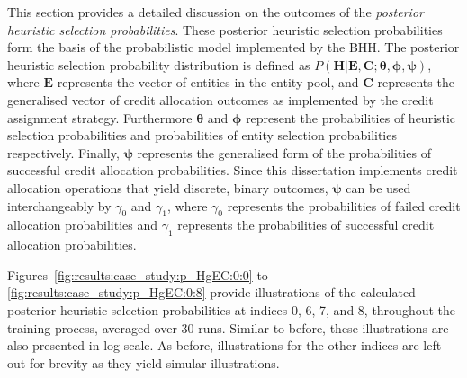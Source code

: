 This section provides a detailed discussion on the outcomes of the \textit{posterior heuristic selection probabilities}. These posterior heuristic selection probabilities form the basis of the probabilistic model implemented by the \acs{BHH}. The posterior heuristic selection probability distribution is defined as $P(\boldsymbol{H} \vert \boldsymbol{E}, \boldsymbol{C}; \boldsymbol{\theta}, \boldsymbol{\phi}, \boldsymbol{\psi})$, where $\boldsymbol{E}$ represents the vector of entities in the entity pool, and $\boldsymbol{C}$ represents the generalised vector of credit allocation outcomes as implemented by the credit assignment strategy. Furthermore $\boldsymbol{\theta}$ and $\boldsymbol{\phi}$ represent the probabilities of heuristic selection probabilities and probabilities of entity selection probabilities respectively. Finally, $\boldsymbol{\psi}$ represents the generalised form of the probabilities of successful credit allocation probabilities. Since this dissertation implements credit allocation operations that yield discrete, binary outcomes, $\boldsymbol{\psi}$ can be used interchangeably by $\gamma_{0}$ and $\gamma_{1}$, where $\gamma_{0}$ represents the probabilities of failed credit allocation probabilities and $\gamma_{1}$ represents the probabilities of successful credit allocation probabilities.

Figures~\ref{fig:results:case_study:p_HgEC:0:0} to \ref{fig:results:case_study:p_HgEC:0:8} provide illustrations of the calculated posterior heuristic selection probabilities at indices 0, 6, 7, and 8, throughout the training process, averaged over 30 runs. Similar to before, these illustrations are also presented in log scale. As before, illustrations for the other indices are left out for brevity as they yield simular illustrations.

